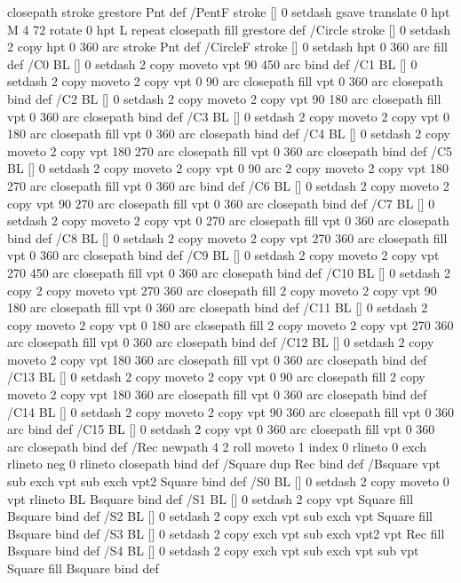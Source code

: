 {{{{  closepath stroke grestore Pnt} def
/PentF {stroke [] 0 setdash gsave
  translate 0 hpt M 4 {72 rotate 0 hpt L} repeat
  closepath fill grestore} def
/Circle {stroke [] 0 setdash 2 copy
  hpt 0 360 arc stroke Pnt} def
/CircleF {stroke [] 0 setdash hpt 0 360 arc fill} def
/C0 {BL [] 0 setdash 2 copy moveto vpt 90 450 arc} bind def
/C1 {BL [] 0 setdash 2 copy moveto
	2 copy vpt 0 90 arc closepath fill
	vpt 0 360 arc closepath} bind def
/C2 {BL [] 0 setdash 2 copy moveto
	2 copy vpt 90 180 arc closepath fill
	vpt 0 360 arc closepath} bind def
/C3 {BL [] 0 setdash 2 copy moveto
	2 copy vpt 0 180 arc closepath fill
	vpt 0 360 arc closepath} bind def
/C4 {BL [] 0 setdash 2 copy moveto
	2 copy vpt 180 270 arc closepath fill
	vpt 0 360 arc closepath} bind def
/C5 {BL [] 0 setdash 2 copy moveto
	2 copy vpt 0 90 arc
	2 copy moveto
	2 copy vpt 180 270 arc closepath fill
	vpt 0 360 arc} bind def
/C6 {BL [] 0 setdash 2 copy moveto
	2 copy vpt 90 270 arc closepath fill
	vpt 0 360 arc closepath} bind def
/C7 {BL [] 0 setdash 2 copy moveto
	2 copy vpt 0 270 arc closepath fill
	vpt 0 360 arc closepath} bind def
/C8 {BL [] 0 setdash 2 copy moveto
	2 copy vpt 270 360 arc closepath fill
	vpt 0 360 arc closepath} bind def
/C9 {BL [] 0 setdash 2 copy moveto
	2 copy vpt 270 450 arc closepath fill
	vpt 0 360 arc closepath} bind def
/C10 {BL [] 0 setdash 2 copy 2 copy moveto vpt 270 360 arc closepath fill
	2 copy moveto
	2 copy vpt 90 180 arc closepath fill
	vpt 0 360 arc closepath} bind def
/C11 {BL [] 0 setdash 2 copy moveto
	2 copy vpt 0 180 arc closepath fill
	2 copy moveto
	2 copy vpt 270 360 arc closepath fill
	vpt 0 360 arc closepath} bind def
/C12 {BL [] 0 setdash 2 copy moveto
	2 copy vpt 180 360 arc closepath fill
	vpt 0 360 arc closepath} bind def
/C13 {BL [] 0 setdash 2 copy moveto
	2 copy vpt 0 90 arc closepath fill
	2 copy moveto
	2 copy vpt 180 360 arc closepath fill
	vpt 0 360 arc closepath} bind def
/C14 {BL [] 0 setdash 2 copy moveto
	2 copy vpt 90 360 arc closepath fill
	vpt 0 360 arc} bind def
/C15 {BL [] 0 setdash 2 copy vpt 0 360 arc closepath fill
	vpt 0 360 arc closepath} bind def
/Rec {newpath 4 2 roll moveto 1 index 0 rlineto 0 exch rlineto
	neg 0 rlineto closepath} bind def
/Square {dup Rec} bind def
/Bsquare {vpt sub exch vpt sub exch vpt2 Square} bind def
/S0 {BL [] 0 setdash 2 copy moveto 0 vpt rlineto BL Bsquare} bind def
/S1 {BL [] 0 setdash 2 copy vpt Square fill Bsquare} bind def
/S2 {BL [] 0 setdash 2 copy exch vpt sub exch vpt Square fill Bsquare} bind def
/S3 {BL [] 0 setdash 2 copy exch vpt sub exch vpt2 vpt Rec fill Bsquare} bind def
/S4 {BL [] 0 setdash 2 copy exch vpt sub exch vpt sub vpt Square fill Bsquare} bind def
}}}
